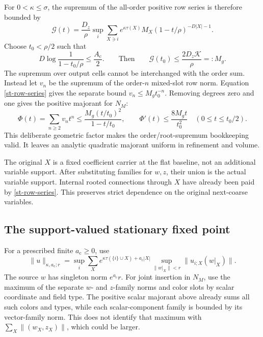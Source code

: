 \documentclass[11pt]{article}
\theoremstyle{remark}
\begin{document}
For $0<\kappa\le\sigma$, the supremum of the all-order positive row
series is therefore bounded by
\begin{equation}
 \mathcal G(t)=\frac{D_z}{\rho}\sup_i\sum_{X\ni i}
 e^{\kappa\tau(X)}M_X(1-t/\rho)^{-D|X|-1}.                  \label{st-row-series}
\end{equation}
Choose $t_0<\rho/2$ such that
\begin{equation}
 D\log\frac1{1-t_0/\rho}\le\frac{A_{\mathrm c}}2.
 \qquad\text{Then}\qquad
 \mathcal G(t_0)\le\frac{2D_z\mathcal K}{\rho}=:M_g.         \label{st-majorant-radius}
\end{equation}
The supremum over output cells cannot be interchanged with the order
sum. Instead let $v_n$ be the supremum of the order-$n$ mixed-slot row
norm. Equation \eqref{st-row-series} gives the separate bound
$v_n\le M_gt_0^{-n}$. Removing degrees zero and one gives the positive
majorant for $N_M$:
\begin{equation}
 \Phi(t)=\sum_{n\ge2}v_nt^n
 \le\frac{M_g(t/t_0)^2}{1-t/t_0},\qquad
 \Phi'(t)\le\frac{8M_gt}{t_0^2}\quad(0\le t\le t_0/2).
                                                               \label{st-nonlinear-majorant}
\end{equation}
This deliberate geometric factor makes the order/root-supremum
bookkeeping valid. It leaves an analytic quadratic majorant uniform in
refinement and volume.

The original $X$ is a fixed coefficient carrier at the flat baseline,
not an additional variable support. After substituting families for
$w,z$, their union is the actual variable support. Internal rooted
connections through $X$ have already been paid by
\eqref{st-row-series}. This preserves strict dependence on the original
next-coarse variables.

\subsection{The support-valued stationary fixed point}
\label{st-contraction-section}

For a prescribed finite $a_{\mathrm c}\ge0$, use
\begin{equation}
 \|u\|_{\kappa,a_{\mathrm c};r}
 =\sup_i\sum_X e^{\kappa\tau(\{i\}\cup X)+a_{\mathrm c}|X|}
             \sup_{\|w|_X\|<r}\|u_{i;X}(w|_X)\|.            \label{st-rooted-norm}
\end{equation}
The source $w$ has singleton norm $e^{a_{\mathrm c}}r$. For joint insertion
in $N_M$, use the maximum of the separate $w$- and $z$-family norms and
color slots by scalar coordinate and field type. The positive scalar
majorant above already sums all such colors and types, while each
scalar-component family is bounded by its vector-family norm. This
does not identify that maximum with
$\sum_X\|(w_X,z_X)\|$, which could be larger.
\end{document}
